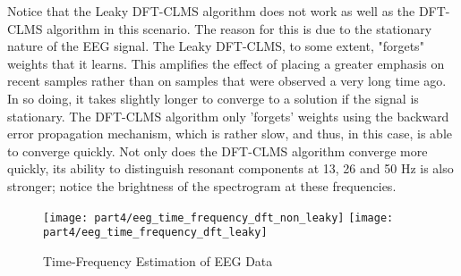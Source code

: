 \noindent{}Notice that the Leaky DFT-CLMS algorithm does not work as well as the DFT-CLMS algorithm in this scenario. The reason for this is due to the stationary nature of the EEG signal. The Leaky DFT-CLMS, to some extent, "forgets" weights that it learns. This amplifies the effect of placing a greater emphasis on recent samples rather than on samples that were observed a very long time ago.  In so doing, it takes slightly longer to converge to a solution if the signal is stationary. The DFT-CLMS algorithm only 'forgets' weights using the backward error propagation mechanism, which is rather slow, and thus, in this case, is able to converge quickly. Not only does the DFT-CLMS algorithm converge more quickly, its ability to distinguish resonant components at 13, 26 and 50 Hz is also stronger; notice the brightness of the spectrogram at these frequencies. 

\begin{figure}[H]
\centering{}
\texttt{[image: part4/eeg\_time\_frequency\_dft\_non\_leaky]}
\texttt{[image: part4/eeg\_time\_frequency\_dft\_leaky]}
\caption{Time-Frequency Estimation of EEG Data}
\end{figure}





